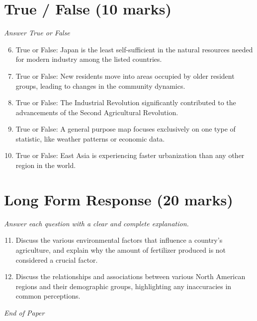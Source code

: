 \documentclass[12pt]{article}
\begin{document}
\section*{True / False (10 marks)}
\textit{Answer True or False}
\begin{enumerate}[label=\arabic*.]
\setcounter{enumi}{5}
\item True or False: Japan is the least self-sufficient in the natural resources needed for modern industry among the listed countries.
\item True or False: New residents move into areas occupied by older resident groups, leading to changes in the community dynamics.
\item True or False: The Industrial Revolution significantly contributed to the advancements of the Second Agricultural Revolution.
\item True or False: A general purpose map focuses exclusively on one type of statistic, like weather patterns or economic data.
\item True or False: East Asia is experiencing faster urbanization than any other region in the world.
\end{enumerate}

\section*{Long Form Response (20 marks)}
\textit{Answer each question with a clear and complete explanation.}
\begin{enumerate}[label=\arabic*.]
\setcounter{enumi}{10}
\item Discuss the various environmental factors that influence a country's agriculture, and explain why the amount of fertilizer produced is not considered a crucial factor.
\item Discuss the relationships and associations between various North American regions and their demographic groups, highlighting any inaccuracies in common perceptions.
\end{enumerate}

\vfill
\noindent\textit{End of Paper}
\end{document}
